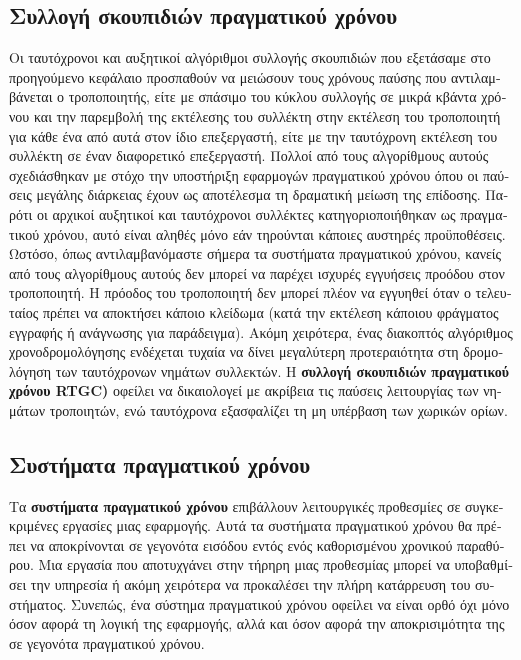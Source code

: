 \begin{greek}
\chapter{Συλλογή σκουπιδιών πραγματικού χρόνου}\label{ch:rt}
Οι ταυτόχρονοι και αυξητικοί αλγόριθμοι συλλογής σκουπιδιών
που εξετάσαμε στο προηγούμενο κεφάλαιο προσπαθούν να μειώσουν
τους χρόνους παύσης που αντιλαμβάνεται ο τροποποιητής, είτε
με σπάσιμο του κύκλου συλλογής σε μικρά κβάντα χρόνου και την
παρεμβολή της εκτέλεσης του συλλέκτη στην εκτέλεση του τροποποιητή
για κάθε ένα από αυτά στον ίδιο επεξεργαστή, είτε με την ταυτόχρονη
εκτέλεση του συλλέκτη σε έναν διαφορετικό επεξεργαστή. Πολλοί
από τους αλγορίθμους αυτούς σχεδιάσθηκαν με στόχο την υποστήριξη
εφαρμογών πραγματικού χρόνου όπου οι παύσεις μεγάλης διάρκειας
έχουν ως αποτέλεσμα τη δραματική μείωση της επίδοσης. Παρότι
οι αρχικοί αυξητικοί και ταυτόχρονοι συλλέκτες κατηγοριοποιήθηκαν
ως πραγματικού χρόνου, αυτό είναι αληθές μόνο εάν τηρούνται
κάποιες αυστηρές προϋποθέσεις. Ωστόσο, όπως αντιλαμβανόμαστε
σήμερα τα συστήματα πραγματικού χρόνου, κανείς από τους αλγορίθμους
αυτούς δεν μπορεί να παρέχει ισχυρές εγγυήσεις προόδου στον
τροποποιητή. Η πρόοδος του τροποποιητή δεν μπορεί πλέον να
εγγυηθεί όταν ο τελευταίος πρέπει να αποκτήσει κάποιο κλείδωμα
(κατά την εκτέλεση κάποιου φράγματος εγγραφής ή ανάγνωσης για
παράδειγμα). Ακόμη χειρότερα, ένας διακοπτός αλγόριθμος χρονοδρομολόγησης
ενδέχεται τυχαία να δίνει μεγαλύτερη προτεραιότητα στη δρομολόγηση
των ταυτόχρονων νημάτων συλλεκτών. Η \textbf{συλλογή σκουπιδιών
πραγματικού χρόνου RTGC)} οφείλει να δικαιολογεί με ακρίβεια
τις παύσεις λειτουργίας των νημάτων τροποιητών, ενώ ταυτόχρονα
εξασφαλίζει τη μη υπέρβαση των χωρικών ορίων.

\section{Συστήματα πραγματικού χρόνου}
Τα \textbf{συστήματα πραγματικού χρόνου} επιβάλλουν λειτουργικές
προθεσμίες σε συγκεκριμένες εργασίες μιας εφαρμογής. Αυτά τα
συστήματα πραγματικού χρόνου θα πρέπει να αποκρίνονται σε
γεγονότα εισόδου εντός ενός καθορισμένου χρονικού παραθύρου.
Μια εργασία που αποτυχγάνει στην τήρηρη μιας προθεσμίας μπορεί
να υποβαθμίσει την υπηρεσία ή ακόμη χειρότερα να προκαλέσει
την πλήρη κατάρρευση του συστήματος. Συνεπώς, ένα σύστημα
πραγματικού χρόνου οφείλει να είναι ορθό όχι μόνο όσον αφορά
τη λογική της εφαρμογής, αλλά και όσον αφορά την αποκρισιμότητα
της σε γεγονότα πραγματικού χρόνου.


\end{greek}

